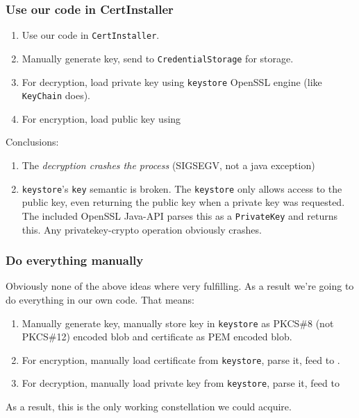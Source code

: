 \documentclass[a4paper]{scrartcl}
\begin{document}
		\subsubsection{Use our code in CertInstaller}
			\begin{enumerate}
				\item Use our code in \texttt{CertInstaller}.
				\item Manually generate key, send to \texttt{CredentialStorage} for storage.
				\item For decryption, load private key using \texttt{keystore} OpenSSL engine (like \texttt{KeyChain} does).
				\item For encryption, load public key using 
			\end{enumerate}
			Conclusions:
			\begin{enumerate}
				\item The \emph{decryption crashes the process} (SIGSEGV, not a java exception)
				\item \texttt{keystore}'s \texttt{key} semantic is broken. The \texttt{keystore} only allows access to the public key, even returning the public key when a private key was requested. The included OpenSSL Java-API parses this as a \texttt{PrivateKey} and returns this. Any privatekey-crypto operation obviously crashes.
			\end{enumerate}
		
		\subsubsection{Do everything manually}
			Obviously none of the above ideas where very fulfilling. As a result we're going to do everything in our own code. That means:
			\begin{enumerate}
				\item Manually generate key, manually store key in \texttt{keystore} as PKCS\#8 (not PKCS\#12) encoded blob and certificate as PEM encoded blob.
				\item For encryption, manually load certificate from \texttt{keystore}, parse it, feed to .
				\item For decryption, manually load private key from \texttt{keystore}, parse it, feed to 
			\end{enumerate}
			As a result, this is the only working constellation we could acquire.
\end{document}
